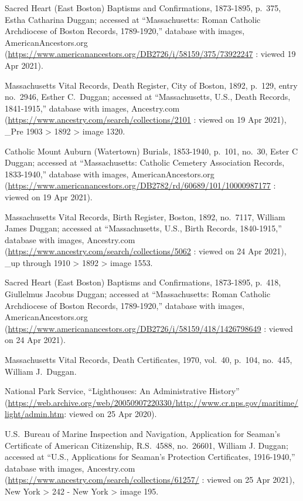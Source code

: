 \begin{thebibliography}{999}
Sacred Heart (East Boston) Baptisms and Confirmations, 1873-1895, p.\ 375, Estha Catharina Duggan; accessed at ``Massachusetts: Roman Catholic Archdiocese of Boston Records, 1789-1920,'' database with images, AmericanAncestors.org (\url{https://www.americanancestors.org/DB2726/i/58159/375/73922247} : viewed 19 Apr 2021).

Massachusetts Vital Records, Death Register, City of Boston, 1892, p.\ 129, entry no.\ 2946, Esther C.\ Duggan; accessed at ``Massachusetts, U.S., Death Records, 1841-1915,'' database with images, Ancestry.com (\url{https://www.ancestry.com/search/collections/2101} : viewed on 19 Apr 2021), \_Pre 1903 > 1892 > image 1320.

Catholic Mount Auburn (Watertown) Burials, 1853-1940, p.\ 101, no.\ 30, Ester C Duggan; accessed at ``Massachusetts: Catholic Cemetery Association Records, 1833-1940,'' database with images, AmericanAncestors.org (\url{https://www.americanancestors.org/DB2782/rd/60689/101/10000987177} : viewed on 19 Apr 2021).

Massachusetts Vital Records, Birth Register, Boston, 1892, no.\ 7117, William James Duggan; accessed at ``Massachusetts, U.S., Birth Records, 1840-1915,'' database with images, Ancestry.com (\url{https://www.ancestry.com/search/collections/5062} : viewed on 24 Apr 2021), \_up through 1910 > 1892 > image 1553.

Sacred Heart (East Boston) Baptisms and Confirmations, 1873-1895, p.\ 418, Giullelmus Jacobus Duggan; accessed at ``Massachusetts: Roman Catholic Archdiocese of Boston Records, 1789-1920,'' database with images, AmericanAncestors.org (\url{https://www.americanancestors.org/DB2726/i/58159/418/1426798649} : viewed on 24 Apr 2021).

Massachusetts Vital Records, Death Certificates, 1970, vol.\ 40, p.\ 104, no.\ 445, William J.\ Duggan.

National Park Service, ``Lighthouses: An Administrative History'' (\url{https://web.archive.org/web/20050907220330/http://www.cr.nps.gov/maritime/light/admin.htm}: viewed on 25 Apr 2020).

U.S.\ Bureau of Marine Inspection and Navigation, Application for Seaman's Certificate of American Citizenship, R.S.\ 4588, no.\ 26601, William J. Duggan; accessed at ``U.S., Applications for Seaman's Protection Certificates, 1916-1940,'' database with images, Ancestry.com (\url{https://www.ancestry.com/search/collections/61257/} : viewed on 25 Apr 2021), New York > 242 - New York > image 195.


\end{thebibliography}
